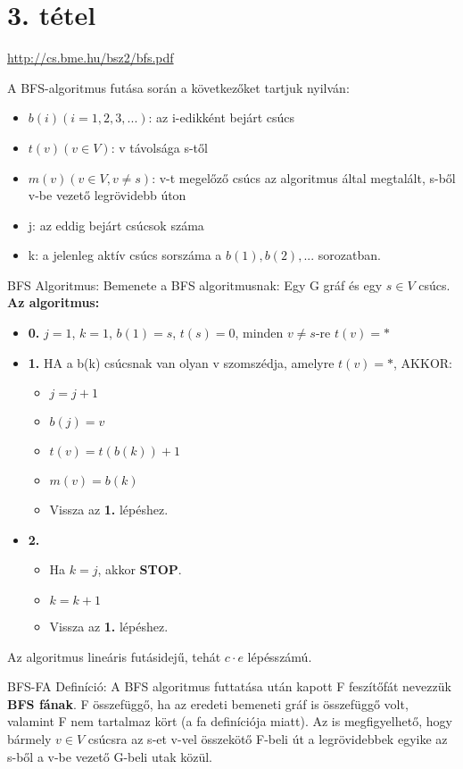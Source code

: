\section{3. tétel}

\url{http://cs.bme.hu/bsz2/bfs.pdf}
\begin{framed}
A BFS-algoritmus futása során a következőket tartjuk nyilván:
\begin{itemize}
\item $b(i) (i = 1,2,3,...)$: az i-edikként bejárt csúcs
\item $t(v) (v \in V)$: v távolsága s-től
\item $m(v) (v \in V, v \neq s)$: v-t megelőző csúcs az algoritmus által megtalált, s-ből v-be vezető legrövidebb úton
\item j: az eddig bejárt csúcsok száma
\item k: a jelenleg aktív csúcs sorszáma a $b(1), b(2),...$ sorozatban.
\end{itemize}
\end{framed}
\begin{framed}
BFS Algoritmus:
Bemenete a BFS algoritmusnak: Egy G gráf és egy $s \in V$ csúcs.
\\
\textbf{Az algoritmus:}
\begin{itemize}
\item{\textbf{0.}} $j = 1$, $k = 1$, $b(1) = s$, $t(s) = 0$, minden $v \neq s$-re $t(v) = *$
\item{\textbf{1.}} HA a b(k) csúcsnak van olyan v szomszédja, amelyre $t(v) = *$, AKKOR:
	\begin{itemize}
	\item $j = j + 1$
	\item $b(j) = v$
	\item $t(v) = t(b(k)) + 1$
	\item $m(v) = b(k)$
	\item Vissza az \textbf{1.} lépéshez.
	\end{itemize}
\item{\textbf{2.}}
	\begin{itemize}
	\item Ha $k = j$, akkor \textbf{STOP}.
	\item $k = k + 1$
	\item Vissza az \textbf{1.} lépéshez.
	\end{itemize}
\end{itemize}
Az algoritmus lineáris futásidejű, tehát $c \cdot e$ lépésszámú.
\end{framed}
\begin{shaded}
BFS-FA Definíció: A BFS algoritmus futtatása után kapott F feszítőfát nevezzük \textbf{BFS fának}. F összefüggő, ha az eredeti bemeneti gráf is összefüggő volt, valamint F nem tartalmaz kört (a fa definíciója miatt). Az is megfigyelhető, hogy bármely $v \in V$ csúcsra az s-et v-vel összekötő F-beli út a legrövidebbek egyike az s-ből a v-be vezető G-beli utak közül.
\end{shaded}
